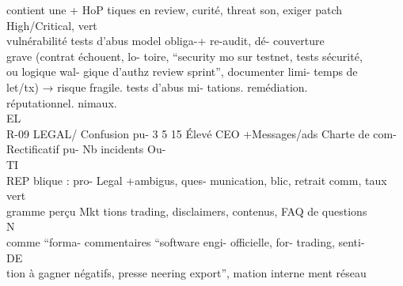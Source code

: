 \documentclass[12pt,landscape,a4paper]{article}
\begin{document}
contient      une              + HoP tiques en review, curité,      threat son, exiger patch High/Critical, vert\\
vulnérabilité                          tests     d’abus model      obliga-+ re-audit, dé- couverture\\
grave    (contrat                      échouent,     lo- toire, “security mo sur testnet, tests sécurité,\\
ou logique wal-                        gique    d’authz review sprint”, documenter limi- temps            de\\
let/tx) → risque                       fragile.          tests d’abus mi- tations.             remédiation.\\
réputationnel.                                           nimaux.\\
\vspace{0.5em}
\vspace{0.5em}
\vspace{0.5em}
\vspace{0.5em}
EL\\
R-09       LEGAL/   Confusion      pu- 3 5 15 Élevé CEO +Messages/ads        Charte de com- Rectificatif pu- Nb incidents Ou-\\
\vspace{0.5em}
\vspace{0.5em}
\vspace{0.5em}
\vspace{0.5em}
TI\\
REP      blique   :    pro-              Legal +ambigus, ques- munication,         blic,     retrait comm, taux vert\\
gramme      perçu               Mkt    tions    trading, disclaimers,     contenus, FAQ de questions\\
\vspace{0.5em}
\vspace{0.5em}
\vspace{0.5em}
\vspace{0.5em}
N\\
comme “forma-                          commentaires “software engi- officielle,         for- trading, senti-\\
\vspace{0.5em}
\vspace{0.5em}
\vspace{0.5em}
\vspace{0.5em}
DE\\
tion à gagner                          négatifs, presse neering export”, mation interne ment réseau\\
\end{document}
